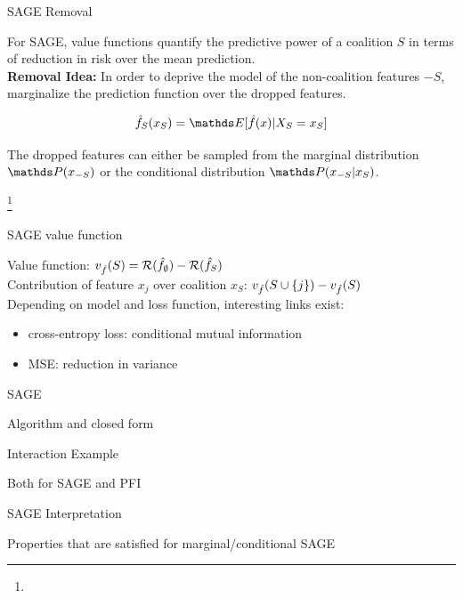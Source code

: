 \documentclass[11pt,compress,t,notes=noshow, xcolor=table]{beamer}
\begin{document}
\begin{vbframe}{SAGE Removal}
  
 For SAGE, value functions quantify the predictive power of a coalition $S$ in terms of reduction in risk over the mean prediction.\\
\lz
\textbf{Removal Idea:} In order to deprive the model of the non-coalition features $-S$, marginalize the prediction function over the dropped features.

$$\fh_S(x_S) = \E[\fh(x) | X_S = x_S]$$
  
The dropped features can either be sampled from the marginal distribution $\P(x_{-S})$ or the conditional distribution $\P(x_{-S}|x_S)$.\\
\lz

  
\footnote[frame]{}
  
\end{vbframe}


\begin{vbframe}{SAGE value function}

Value function:  $ v_{\fh}(S) = \risk(\fh_{\emptyset}) - \risk(\fh_{S})$\\
\lz
Contribution of feature $x_j$ over coalition $x_S$:  $v_{\fh}(S \cup \{j\}) - v_{\fh}(S)$\\
\lz
Depending on model and loss function, interesting links exist:
\begin{itemize}
  \item cross-entropy loss: conditional mutual information
  \item MSE: reduction in variance
\end{itemize}


\end{vbframe}

\begin{vbframe}{SAGE}

Algorithm and closed form
  
\end{vbframe}

\begin{vbframe}{Interaction Example}
  
  Both for SAGE and PFI
  
\end{vbframe}



\begin{vbframe}{SAGE Interpretation}

Properties that are satisfied for marginal/conditional SAGE

\end{vbframe}
\end{document}
